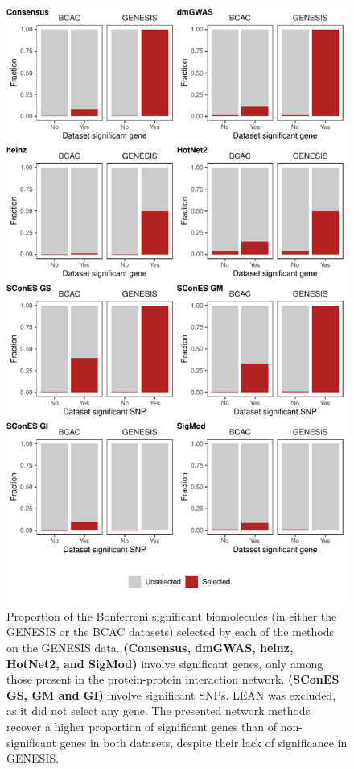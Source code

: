 \documentclass[twocolumn, 10pt]{article}
\begin{document}
\begin{figure}[htbp]
\centering
\includegraphics[width=\textwidth,height=\textheight,keepaspectratio]{./figures/sfigure_4.pdf}
\caption{\label{sfig:bcac_comparison}
Proportion of the Bonferroni significant biomolecules (in either the GENESIS or the BCAC datasets) selected by each of the methods on the GENESIS data. \textbf{(Consensus, dmGWAS, heinz, HotNet2, and SigMod)} involve significant genes, only among those present in the protein-protein interaction network. \textbf{(SConES GS, GM and GI)} involve significant SNPs. LEAN was excluded, as it did not select any gene. The presented network methods recover a higher proportion of significant genes than of non-significant genes in both datasets, despite their lack of significance in GENESIS.}
\end{figure}
\end{document}
